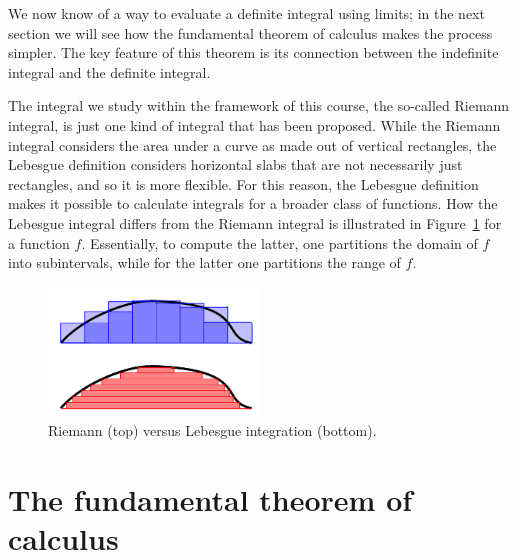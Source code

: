 We now know of a way to evaluate a definite integral using limits; in the next section we will see how the fundamental theorem of calculus makes the process simpler. The key feature of this theorem is its connection between the indefinite integral and the definite integral.

\ifanalysis
\begin{remark}
The integral we study within the framework of this course, the so-called Riemann integral, is just one kind of integral that has been proposed. While the Riemann integral considers the area under a curve as made out of vertical rectangles, the Lebesgue definition considers horizontal slabs that are not necessarily just rectangles, and so it is more flexible. For this reason, the Lebesgue definition makes it possible to calculate integrals for a broader class of functions. How the Lebesgue integral differs from the Riemann integral is illustrated in Figure~\ref{fig_int_8} for a function $f$. Essentially, to compute the latter, one partitions the domain of $f$ into subintervals, while for the latter one partitions the range of $f$.  


\begin{figure}[H]
	\begin{center}
			\includegraphics[width=0.5\textwidth]{fig_int_8}
	\caption{Riemann (top) versus Lebesgue integration (bottom).}
	\label{fig_int_8}
	\end{center}
\end{figure}


\end{remark}
\fi

\section{The fundamental theorem of calculus}\label{sec:FTC}


